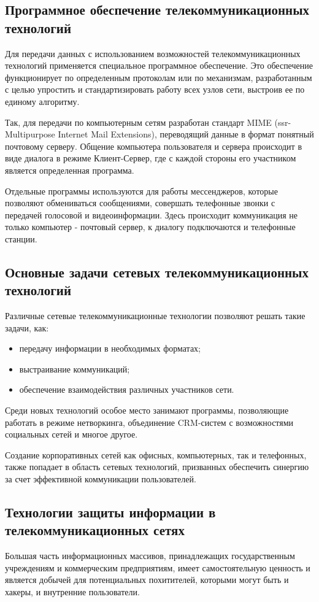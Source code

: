 \documentclass[a4paper]{report}
\begin{document}
\subsection{Программное обеспечение телекоммуникационных \\ технологий}
Для передачи данных с использованием возможностей телекоммуникационных технологий применяется специальное программное обеспечение. Это обеспечение функционирует по определенным протоколам или по механизмам, разработанным с целью упростить и стандартизировать работу всех узлов сети, выстроив ее по единому алгоритму.

Так, для передачи по компьютерным сетям разработан стандарт MIME (ssr-Multipurpose Internet Mail Extensions), переводящий данные в формат понятный почтовому серверу. Общение компьютера пользователя и сервера происходит в виде диалога в режиме Клиент-Сервер, где с каждой стороны его участником является определенная программа.

Отдельные программы используются для работы мессенджеров, которые позволяют обмениваться сообщениями, совершать телефонные звонки с передачей голосовой и видеоинформации. Здесь происходит коммуникация не только компьютер - почтовый сервер, к диалогу подключаются и телефонные станции.

\subsection{Основные задачи сетевых телекоммуникационных технологий}
Различные сетевые телекоммуникационные технологии позволяют решать такие задачи, как:
\begin{itemize}
\item передачу информации в необходимых форматах;
\item выстраивание коммуникаций;
\item обеспечение взаимодействия различных участников сети.
\end{itemize}

Среди новых технологий особое место занимают программы, позволяющие работать в режиме нетворкинга, объединение CRM-систем с возможностями социальных сетей и многое другое.

Создание корпоративных сетей как офисных, компьютерных, так и телефонных, также попадает в область сетевых технологий, призванных обеспечить синергию за счет эффективной коммуникации пользователей.

\subsection{Технологии защиты информации в телекоммуникационных сетях}
Большая часть информационных массивов, принадлежащих государственным учреждениям и коммерческим предприятиям, имеет самостоятельную ценность и является добычей для потенциальных похитителей, которыми могут быть и хакеры, и внутренние пользователи.
\end{document}
